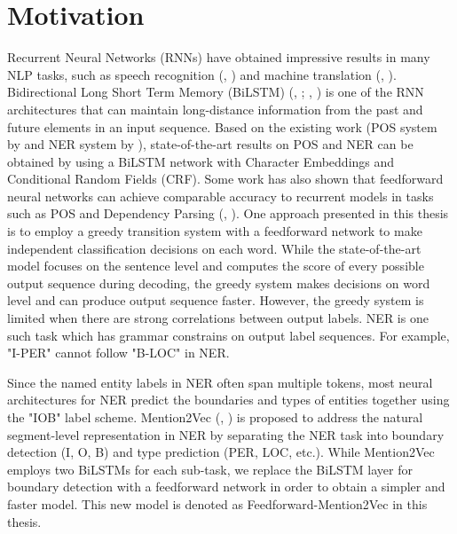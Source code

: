 \section{Motivation}
Recurrent Neural Networks (RNNs) have obtained impressive results in many NLP tasks, such as speech recognition (\citeauthor{graves2013speech}, \citeyear{graves2013speech}) and machine translation (\citeauthor{cho2014properties}, \citeyear{cho2014properties}).
Bidirectional Long Short Term Memory (BiLSTM) (\citeauthor{Hochreiter97longshort-term}, \citeyear{Hochreiter97longshort-term}; \citeauthor{graves2005framewise}, \citeyear{graves2005framewise}) is one of the RNN architectures that can maintain long-distance information from the past and future elements in an input sequence. Based on the existing work (POS system by \cite{ling2015finding} and NER system by \cite{lample2016neural}), state-of-the-art results on POS and NER can be obtained by using a BiLSTM network with Character Embeddings and Conditional Random Fields (CRF). Some work has also shown that feedforward neural networks can achieve comparable accuracy to recurrent models in tasks such as POS and Dependency Parsing (\citeauthor{andor2016globally}, \citeyear{andor2016globally}). One approach presented in this thesis is to employ a greedy transition system with a feedforward network to make independent classification decisions on each word. While the state-of-the-art model focuses on the sentence level and computes the score of every possible output sequence during decoding, the greedy system makes decisions on word level and can produce output sequence faster. However, the greedy system is limited when there are strong correlations between output labels. NER is one such task which has grammar constrains on output label sequences. For example, "I-PER" cannot follow "B-LOC" in NER.

Since the named entity labels in NER often span multiple tokens, most neural architectures for NER predict the boundaries and types of entities together using the "IOB" label scheme. Mention2Vec (\citeauthor{stratos2016mention2vec}, \citeyear{stratos2016mention2vec}) is proposed to address the natural segment-level representation in NER by separating the NER task into boundary detection (I, O, B) and type prediction (PER, LOC, etc.). While Mention2Vec employs two BiLSTMs for each sub-task, we replace the BiLSTM layer for boundary detection with a feedforward network in order to obtain a simpler and faster model. This new model is denoted as Feedforward-Mention2Vec in this thesis.

